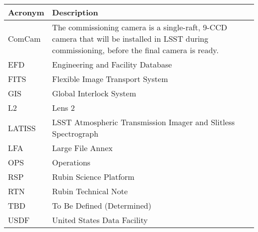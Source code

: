 \addtocounter{table}{-1}
\begin{longtable}{p{}p{}}\hline
\textbf{Acronym} & \textbf{Description}  \\\hline

ComCam & The commissioning camera is a single-raft, 9-CCD camera that will be installed in LSST during commissioning, before the final camera is ready. \\\hline
EFD & Engineering and Facility Database \\\hline
FITS & Flexible Image Transport System \\\hline
GIS & Global Interlock System \\\hline
L2 & Lens 2 \\\hline
LATISS & LSST Atmospheric Transmission Imager and Slitless Spectrograph \\\hline
LFA & Large File Annex \\\hline
OPS & Operations \\\hline
RSP & Rubin Science Platform \\\hline
RTN & Rubin Technical Note \\\hline
TBD & To Be Defined (Determined) \\\hline
USDF & United States Data Facility \\\hline
\end{longtable}
